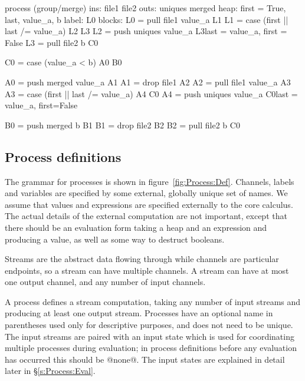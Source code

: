\begin{code}
process (group/merge)
     ins: file1 file2
    outs: uniques merged
    heap: {first = True, last, value_a, b}
   label: L0
  blocks: L0 = pull file1   value_a             L1
          L1 = case (first || last /= value_a)  L2    L3
          L2 = push uniques value_a             L3{last = value_a, first = False}
          L3 = pull file2 b                     C0

          C0 = case (value_a < b)               A0    B0

          A0 = push merged  value_a             A1
          A1 = drop file1                       A2
          A2 = pull file1   value_a             A3
          A3 = case (first || last /= value_a)  A4    C0
          A4 = push uniques value_a             C0{last = value_a, first=False}

          B0 = push merged b                    B1
          B1 = drop file2                       B2
          B2 = pull file2  b                    C0
\end{code}


\subsection{Process definitions}


The grammar for processes is shown in figure~\ref{fig:Process:Def}.
Channels, labels and variables are specified by some external, globally unique set of names.
We assume that values and expressions are specified externally to the core calculus.
The actual details of the external computation are not important, except that there should be an evaluation form taking a heap and an expression and producing a value, as well as some way to destruct booleans.

Streams are the abstract data flowing through while channels are particular endpoints, so a stream can have multiple channels.
A stream can have at most one output channel, and any number of input channels.

A process defines a stream computation, taking any number of input streams and producing at least one output stream.
Processes have an optional name in parentheses used only for descriptive purposes, and does not need to be unique.
The input streams are paired with an input state which is used for coordinating multiple processes during evaluation; in process definitions before any evaluation has occurred this should be @none@.
The input states are explained in detail later in \S\ref{s:Process:Eval}.


